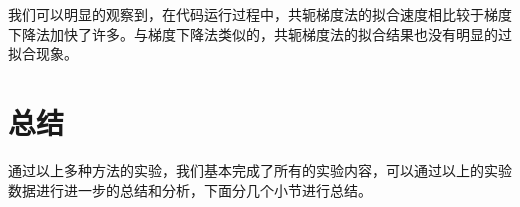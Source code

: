 \documentclass[12pt]{article}
\begin{document}
\begin{figure}[H]
    \centering
\end{figure}
我们可以明显的观察到，在代码运行过程中，共轭梯度法的拟合速度相比较于梯度下降法加快了许多。与梯度下降法类似的，共轭梯度法的拟合结果也没有明显的过拟合现象。
\section{总结}
通过以上多种方法的实验，我们基本完成了所有的实验内容，可以通过以上的实验数据进行进一步的总结和分析，下面分几个小节进行总结。
\end{document}
